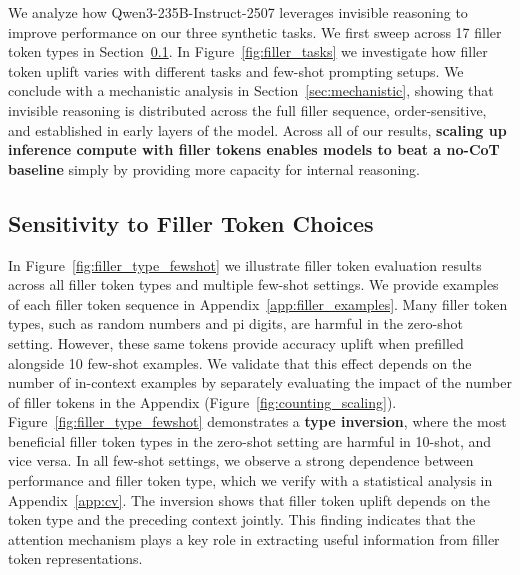 \documentclass{article}
\begin{document}
We analyze how Qwen3-235B-Instruct-2507 leverages invisible reasoning to improve performance on our three synthetic tasks. We first sweep across 17 filler token types in Section~\ref{sec:filler_type}. In Figure~\ref{fig:filler_tasks} we investigate how filler token uplift varies with different tasks and few-shot prompting setups. We conclude with a mechanistic analysis in Section~\ref{sec:mechanistic}, showing that invisible reasoning is distributed across the full filler sequence, order-sensitive, and established in early layers of the model. Across all of our results, \textbf{scaling up inference compute with filler tokens enables models to beat a no-CoT baseline} simply by providing more capacity for internal reasoning.

\subsection{Sensitivity to Filler Token Choices}
\label{sec:filler_type}
In Figure~\ref{fig:filler_type_fewshot} we illustrate filler token evaluation results across all filler token types and multiple few-shot settings. We provide examples of each filler token sequence in Appendix~\ref{app:filler_examples}. Many filler token types, such as random numbers and pi digits, are harmful in the zero-shot setting. However, these same tokens provide accuracy uplift when prefilled alongside 10 few-shot examples. We validate that this effect depends on the number of in-context examples by separately evaluating the impact of the number of filler tokens in the Appendix (Figure~\ref{fig:counting_scaling}). Figure~\ref{fig:filler_type_fewshot} demonstrates a \textbf{type inversion}, where the most beneficial filler token types in the zero-shot setting are harmful in 10-shot, and vice versa. In all few-shot settings, we observe a strong dependence between performance and filler token type, which we verify with a statistical analysis in Appendix~\ref{app:cv}. The inversion shows that filler token uplift depends on the token type and the preceding context jointly. This finding indicates that the attention mechanism plays a key role in extracting useful information from filler token representations.
\end{document}
